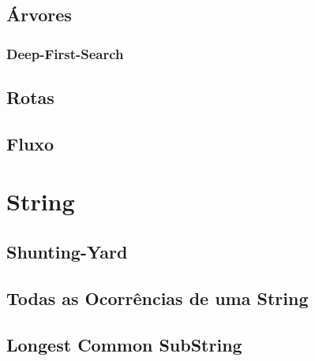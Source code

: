     \section{Árvores}
        \subsection*{Deep-First-Search}
            
        
        \newpage
    \section{Rotas}
        
        
        
        
        
        \newpage
    \section{Fluxo}
\newpage

\chapter{String}
    \section{Shunting-Yard}
        
        \newpage
    \section{Todas as Ocorrências de uma String}
        
    \section{Longest Common SubString}
        
\newpage

